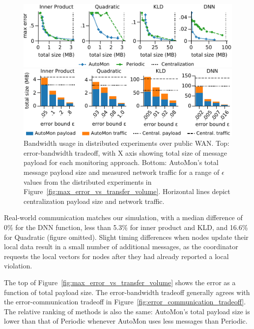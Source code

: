 \begin{figure}
	\centering
	\includegraphics[width=1.0\columnwidth]{figures/max_error_vs_transfer_volume.pdf} 
	
	\vspace{3mm}
	
	\includegraphics[width=1.0\columnwidth]{figures/communication_automon_vs_network.pdf}
	\caption{
	    Bandwidth usage in distributed experiments over public WAN.
	    Top: error-bandwidth tradeoff, with
	    X axis showing total size of message payload for each monitoring approach.
	    Bottom: AutoMon's total message payload size and measured 
	    network traffic for a range of $\epsilon$ values from the distributed experiments in Figure~\ref{fig:max_error_vs_transfer_volume}.
	    Horizontal lines depict centralization payload size and network traffic.
	}
	\label{fig:max_error_vs_transfer_volume}
	\label{fig:communication_automon_vs_network}
\end{figure}

Real-world communication matches our simulation, with a median difference of 0\% for the DNN function, less than 5.3\% for inner product and KLD, and 16.6\% for Quadratic (figure omitted).
Slight timing differences when nodes update their local data result in a small number of additional messages, as the coordinator requests the local vectors for nodes after they had already reported a local violation.

The top of Figure~\ref{fig:max_error_vs_transfer_volume} shows the error as a function of total payload size.
The error-bandwidth tradeoff generally agrees with the error-communication tradeoff in Figure~\ref{fig:error_communication_tradeoff}.
The relative ranking of methods is also the same:
AutoMon's total payload size is lower than that of Periodic whenever AutoMon uses less messages than Periodic.

